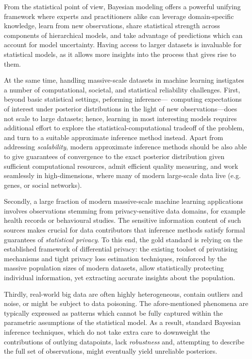 From the statistical point of view, Bayesian modeling offers a powerful unifying framework where experts and practitioners alike can leverage domain-specific knowledge, learn from new observations, share statistical strength across components of hierarchical models, and take advantage of predictions which can account for model uncertainty. Having access to larger datasets is invaluable for statistical models, as it allows more insights into the process that gives rise to them. 

At the same time, handling massive-scale datasets in machine learning instigates a number of computational, societal, and statistical reliability challenges. First, beyond basic statistical settings, peforming inference---\ie~computing expectations of interest under posterior distributions in the light of new observations---does not scale to large datasets; hence, learning in most interesting models requires additional effort to explore the statistical-computational tradeoff of the problem, and turn to a suitable approximate inference method instead. Apart from addressing \emph{scalability}, modern approximate inference methods should be also able to give guarantees of convergence to the exact posterior distribution given sufficient computational resources, admit efficient quality measuring, and work seamlessly in high-dimensions, where many of modern large-scale data live (e.g. genes, or social networks).

Secondly, a large fraction of modern massive-scale machine learning applications involves observations stemming from privacy-sensitive data domains, for example health records or behavioural studies. The sensitive information content of such sources makes crucial for data contributors that inference methods satisfy formal guarantees of \emph{statistical privacy}. To this end, the gold standard is relying on the established framework of differential privacy: the existing toolset of privatising mechanisms and tight privacy loss estimation techniques, reinforced by the massive population sizes of modern datasets, allow statistically protecting individual information, yet extracting accurate insights about the population.

Thirdly, real-world big data are often highly heterogeneous, contain outliers and noise, or might be subject to data poisoning. The afore-mentioned phenomena are typically expressed as patterns which cannot be fully captured within the parametric assumptions of the statistical model. As a result, standard Bayesian inference techniques, which do not take extra care to downweight the contributions of outlying datapoints, lack \emph{robustness} and, attempting to describe the full set of observations, might eventually yield unreliable posteriors. 

